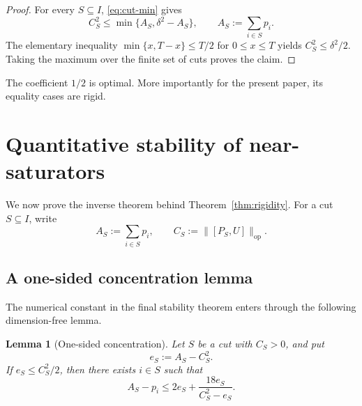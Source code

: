 \documentclass[11pt]{article}
\newtheorem{lemma}[theorem]{Lemma}
\newcommand{\op}{\mathrm{op}}
\newcommand{\dd}{\delta}
\begin{document}
\begin{proof}
For every $S\subseteq I$, \eqref{eq:cut-min} gives
\[
  C_S^2
  \le
  \min\{A_S,\dd^2-A_S\},
  \qquad
  A_S:=\sum_{i\in S}p_i.
\]
The elementary inequality
$\min\{x,T-x\}\le T/2$ for $0\le x\le T$ yields
$C_S^2\le\dd^2/2$.  Taking the maximum over the finite set of cuts proves the
claim.
\end{proof}

The coefficient $1/2$ is optimal.  More importantly for the present paper,
its equality cases are rigid.

\section{Quantitative stability of near-saturators}

We now prove the inverse theorem behind Theorem~\ref{thm:rigidity}.  For a
cut $S\subseteq I$, write
\[
  A_S:=\sum_{i\in S}p_i,
  \qquad
  C_S:=\|[P_S,U]\|_{\op}.
\]

\subsection{A one-sided concentration lemma}

The numerical constant in the final stability theorem enters through the
following dimension-free lemma.

\begin{lemma}[One-sided concentration]\label{lem:onesided}
Let $S$ be a cut with $C_S>0$, and put
\[
  e_S:=A_S-C_S^2.
\]
If $e_S\le C_S^2/2$, then there exists $i\in S$ such that
\begin{equation}\label{eq:onesided}
  A_S-p_i
  \le
  2e_S+\frac{18e_S}{C_S^2-e_S}.
\end{equation}
\end{lemma}
\end{document}
